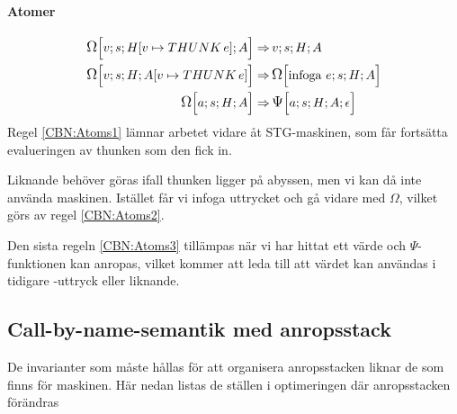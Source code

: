 \documentclass[../Optimise]{subfiles}
\begin{document}
\paragraph{Atomer}
\begin{align}
\label{CBN:Atoms1}\CBNOMEGA s{\heap v{\THUNK e}}Av \Rightarrow &\, \CBNMC vsHA\\
\label{CBN:Atoms2}\CBNOMEGA sH{\abyss v{\THUNK e}}v  \Rightarrow &\, \CBNOMEGA sHA{\text{infoga }e}\\
\label{CBN:Atoms3}\CBNOMEGA sHAa \Rightarrow &\, \CBNPSI sHA{\epsilon}a
\end{align}
Regel \eqref{CBN:Atoms1} lämnar arbetet vidare åt STG-maskinen, som får fortsätta
evalueringen av thunken som den fick in.

Liknande behöver göras ifall thunken ligger på abyssen, men vi kan då inte använda maskinen.
Istället får vi infoga uttrycket och gå vidare med $\Omega$, vilket görs av regel \eqref{CBN:Atoms2}. 

Den sista regeln \eqref{CBN:Atoms3} tillämpas när vi har hittat ett värde och $\Psi$-funktionen kan anropas,
vilket kommer att leda till att värdet kan användas i tidigare -uttryck eller liknande.


\subsection{Call-by-name-semantik med anropsstack}


De invarianter som måste hållas för att organisera anropsstacken liknar de som finns
för maskinen. Här nedan listas de ställen i optimeringen där anropsstacken förändras
\end{document}
